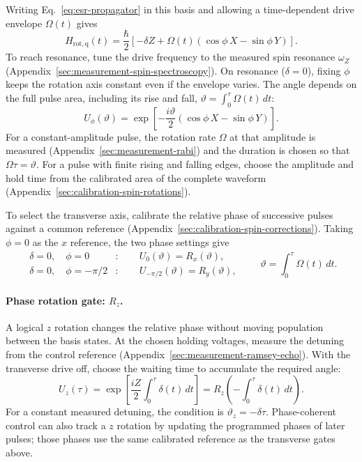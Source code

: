 Writing Eq.~\eqref{eq:esr-propagator} in this basis and allowing
a time-dependent drive envelope $\Omega(t)$ gives
\begin{equation}
  H_{\mathrm{rot,q}}(t)=\frac{\hbar}{2}
       \left[-\delta Z+\Omega(t)(\cos\phi\,X-\sin\phi\,Y)\right].
  \label{eq:logical-phase-drive}
\end{equation}
To reach resonance, tune the drive frequency to the measured spin
resonance $\omega_Z$ (Appendix~\ref{sec:measurement-spin-spectroscopy}).
On resonance ($\delta=0$), fixing $\phi$ keeps the rotation axis constant even
if the envelope varies. The angle depends on the full pulse area,
including its rise and fall,
$\vartheta=\int_0^\tau\Omega(t)\,dt$:
\begin{equation}
  U_\phi(\vartheta)=
  \exp\!\left[-\frac{i\vartheta}{2}
                    (\cos\phi\,X-\sin\phi\,Y)\right].
  \label{eq:phase-controlled-rotation}
\end{equation}
For a constant-amplitude pulse, the rotation rate $\Omega$ at that
amplitude is measured (Appendix~\ref{sec:measurement-rabi}) and the
duration is chosen so that $\Omega\tau=\vartheta$. For a pulse with
finite rising and falling edges, choose the amplitude and hold time
from the calibrated area of the complete waveform
(Appendix~\ref{sec:calibration-spin-rotations}).

To select the transverse axis, calibrate the relative phase of
successive pulses against a common reference
(Appendix~\ref{sec:calibration-spin-corrections}).
Taking $\phi=0$ as the $x$ reference, the two phase settings give
\begin{equation}
 \begin{aligned}
  \delta=0,\quad\phi=0
    &: \qquad U_0(\vartheta)=R_x(\vartheta),\\
  \delta=0,\quad\phi=-\pi/2
    &: \qquad U_{-\pi/2}(\vartheta)=R_y(\vartheta),
 \end{aligned}
 \qquad \vartheta=\int_0^\tau\Omega(t)\,dt.
 \label{eq:single-spin-transverse-gates}
\end{equation}
\paragraph{Phase rotation gate: \texorpdfstring{$R_z$}{Rz}.}
A logical $z$ rotation changes the relative phase without
moving population between the basis states. At the chosen holding
voltages, measure the detuning from the control reference
(Appendix~\ref{sec:measurement-ramsey-echo}). With the transverse
drive off, choose the waiting time to accumulate the required angle:
\begin{equation}
  U_z(\tau)=\exp\!\left[\frac{iZ}{2}\int_0^\tau\delta(t)\,dt\right]
            =R_z\!\left(-\int_0^\tau\delta(t)\,dt\right).
  \label{eq:detuning-z-gate}
\end{equation}
For a constant measured detuning, the condition is
$\vartheta_z=-\delta\tau$. Phase-coherent control can also track
a $z$ rotation by updating the programmed phases of later pulses;
those phases use the same calibrated reference as the transverse
gates above.

